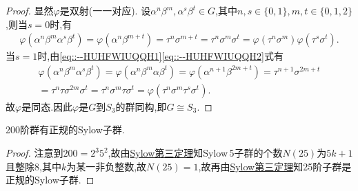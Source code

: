 \documentclass[../../main.tex]{subfiles}%
\begin{document}
\begin{proof}
显然$\varphi$是双射(一一对应).
设$\alpha^n\beta^m,\alpha^s\beta^t\in G$,其中$n,s\in \{ 0,1 \} ,m,t\in \{ 0,1,2 \} $,则当$s=0$时,有
\begin{align*}
\varphi (\alpha^n\beta^m\alpha^s\beta^t)=\varphi (\alpha^n\beta^{m+t})=\tau^n\sigma^{m+t}=\tau^n\sigma^m\sigma^t=\varphi (\tau^n\sigma^m)\varphi (\tau^s\sigma^t).
\end{align*}
当$s=1$时,由\eqref{eq::--HUHFWIUQQH1}\eqref{eq::--HUHFWIUQQH2}式有
\begin{align*}
\varphi (\alpha^n\beta^m\alpha^s\beta^t)=\varphi (\alpha^n\beta^m\alpha \beta^t)=\varphi (\alpha^{n+1}\beta^{2m+t})=\tau^{n+1}\sigma^{2m+t}\\
=\tau^n\tau \sigma^{2m}\sigma^t=\tau^n\sigma^m\tau \sigma^t=\varphi (\tau^n\sigma^m\tau^s\sigma^t).
\end{align*}
故$\varphi$是同态.因此$\varphi$是$G$到$S_3$的群同构,即$G\cong S_3$.

\end{proof}

\begin{example}
200阶群有正规的Sylow子群.
\end{example}
\begin{proof}

注意到$200=2^3 5^2$,故由\hyperref[theorem:Sylow第三定理]{Sylow第三定理}知Sylow$\,$5子群的个数$N(25)$为$5k+1$且整除8,其中$k$为某一非负整数,故$N(25)=1$,故再由\hyperref[theorem:Sylow第三定理]{Sylow第三定理}知25阶子群是正规的Sylow子群.

\end{proof}
\end{document}
